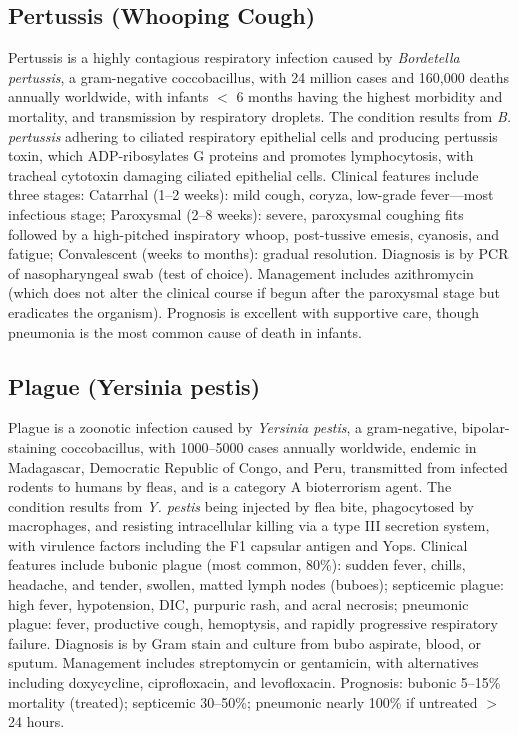 \subsection{Pertussis (Whooping Cough)}
\label{sec:Pertussis}
Pertussis is a highly contagious respiratory infection caused by \textit{Bordetella pertussis}, a gram-negative coccobacillus, with 24 million cases and 160,000 deaths annually worldwide, with infants $<$ 6 months having the highest morbidity and mortality, and transmission by respiratory droplets. The condition results from \textit{B. pertussis} adhering to ciliated respiratory epithelial cells and producing pertussis toxin, which ADP-ribosylates G proteins and promotes lymphocytosis, with tracheal cytotoxin damaging ciliated epithelial cells. Clinical features include three stages: Catarrhal (1--2 weeks): mild cough, coryza, low-grade fever---most infectious stage; Paroxysmal (2--8 weeks): severe, paroxysmal coughing fits followed by a high-pitched inspiratory whoop, post-tussive emesis, cyanosis, and fatigue; Convalescent (weeks to months): gradual resolution. Diagnosis is by PCR of nasopharyngeal swab (test of choice). Management includes azithromycin (which does not alter the clinical course if begun after the paroxysmal stage but eradicates the organism). Prognosis is excellent with supportive care, though pneumonia is the most common cause of death in infants.

\subsection{Plague (Yersinia pestis)}
\label{sec:Plague}
Plague is a zoonotic infection caused by \textit{Yersinia pestis}, a gram-negative, bipolar-staining coccobacillus, with 1000--5000 cases annually worldwide, endemic in Madagascar, Democratic Republic of Congo, and Peru, transmitted from infected rodents to humans by fleas, and is a category A bioterrorism agent. The condition results from \textit{Y. pestis} being injected by flea bite, phagocytosed by macrophages, and resisting intracellular killing via a type III secretion system, with virulence factors including the F1 capsular antigen and Yops. Clinical features include bubonic plague (most common, 80\%): sudden fever, chills, headache, and tender, swollen, matted lymph nodes (buboes); septicemic plague: high fever, hypotension, DIC, purpuric rash, and acral necrosis; pneumonic plague: fever, productive cough, hemoptysis, and rapidly progressive respiratory failure. Diagnosis is by Gram stain and culture from bubo aspirate, blood, or sputum. Management includes streptomycin or gentamicin, with alternatives including doxycycline, ciprofloxacin, and levofloxacin. Prognosis: bubonic 5--15\% mortality (treated); septicemic 30--50\%; pneumonic nearly 100\% if untreated $>$ 24 hours.

